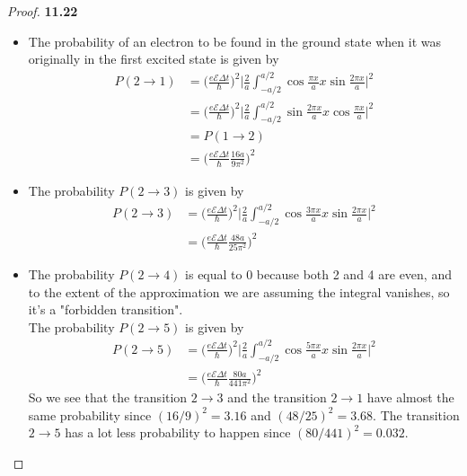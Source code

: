 \documentclass[11pt]{article}
\theoremstyle{definition}
\begin{document}
\cleardoublepage
\begin{proof}{\textbf{11.22}}\\
\begin{itemize}
\item [\textbf{(a)}] The probability of an electron to be found in the ground
state when it was originally in the first excited state is given by
\begin{align*}
    P(2 \to 1) &= \bigg(\frac{e\mathcal{E}\Delta t}{\hbar}\bigg)^2
    \bigg|\frac{2}{a}\int_{-a/2}^{a/2}
    \cos\frac{\pi x}{a} x \sin\frac{2\pi x}{a} \bigg|^2 \\
    &= \bigg(\frac{e\mathcal{E}\Delta t}{\hbar}\bigg)^2
    \bigg|\frac{2}{a}\int_{-a/2}^{a/2}
    \sin\frac{2\pi x}{a} x \cos\frac{\pi x}{a} \bigg|^2 \\
    &= P(1 \to 2) \\
    &= \bigg(\frac{e\mathcal{E}\Delta t}{\hbar}\frac{16a}{9\pi^2}\bigg)^2
\end{align*}

\item [\textbf{(b)}] The probability $P(2 \to 3)$ is given by
\begin{align*}
    P(2 \to 3) &= \bigg(\frac{e\mathcal{E}\Delta t}{\hbar}\bigg)^2
    \bigg|\frac{2}{a}\int_{-a/2}^{a/2}
    \cos\frac{3\pi x}{a} x \sin\frac{2\pi x}{a} \bigg|^2 \\
    &= \bigg(\frac{e\mathcal{E}\Delta t}{\hbar}\frac{48 a}{25\pi^2}\bigg)^2
\end{align*}

\item [\textbf{(c)}] The probability $P(2 \to 4)$ is equal to 0 because both
2 and 4 are even, and to the extent of the approximation we are assuming the
integral vanishes, so it's a "forbidden transition".\\
The probability $P(2 \to 5)$ is given by
\begin{align*}
    P(2 \to 5) &= \bigg(\frac{e\mathcal{E}\Delta t}{\hbar}\bigg)^2
    \bigg|\frac{2}{a}\int_{-a/2}^{a/2}
    \cos\frac{5\pi x}{a} x \sin\frac{2\pi x}{a} \bigg|^2 \\
    &= \bigg(\frac{e\mathcal{E}\Delta t}{\hbar}\frac{80 a}{441\pi^2}\bigg)^2
\end{align*}
So we see that the transition $2 \to 3$ and the transition $2 \to 1$ have
almost the same probability since $(16/9)^2 = 3.16$ and $(48/25)^2 = 3.68$.
The transition $2 \to 5$ has a lot less probability to happen since
$(80/441)^2 = 0.032$.

\end{itemize}
\end{proof}
\end{document}
